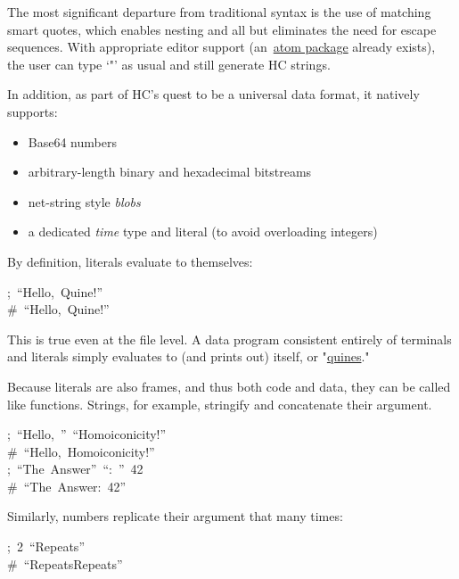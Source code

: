 \documentclass[preprint]{{acmart}}
\begin{document}
The most significant departure from traditional syntax is the use of
matching smart quotes, which enables nesting and all but eliminates the
need for escape sequences. With appropriate editor support (an~\href{https://github.com/TheSwanFactory/language-maml}{atom
package} already exists),
the user can type \textquoteleft{}"\textquoteright{} as usual and still generate HC strings.%

In addition, as part of HC's quest to be a universal data format, it
natively supports:%

\begin{itemize}[noitemsep,topsep=\mdcompacttopsep]%

\item{}Base64 numbers%

\item{}arbitrary-length binary and hexadecimal bitstreams%

\item{}net-string style \emph{blobs}%

\item{}a dedicated \emph{time} type and literal (to avoid overloading integers)%
\end{itemize}%

\noindent{}By definition, literals evaluate to themselves:%
\begin{mdpre}%
\noindent;~“{Hello},~{Quine!}”\\
{\#~“Hello,~Quine!”}%
\end{mdpre}\noindent{}This is true even at the file level. A data program consistent entirely
of terminals and literals simply evaluates to (and prints out) itself, or
"\href{https://en.wikipedia.org/wiki/Quine_\%2528computing\%2529}{quines}."

Because literals are also frames, and thus both code and data, they can
be called like functions. Strings, for example, stringify and concatenate
their argument.%
\begin{mdpre}%
\noindent;~“{Hello},~”~“{Homoiconicity!}”\\
{\#~“Hello,~Homoiconicity!”}\\
;~“{The}~{Answer}”~“{:}~”~{42}\\
{\#~“The~Answer:~42”}%
\end{mdpre}\noindent{}Similarly, numbers replicate their argument that many times:
\begin{mdpre}%
\noindent;~2~“{Repeats}”\\
{\#~“RepeatsRepeats”}%
\end{mdpre}
\end{document}
